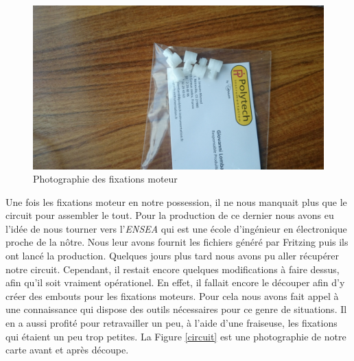 \documentclass[a4paper,10pt]{report}
\begin{document}
      \begin{figure}[htbp]%
	\centering
	\includegraphics[scale = 0.1]{img/fixations.jpg}
	\caption{Photographie des fixations moteur}
	\label{fixation}
      \end{figure}

      Une fois les fixations moteur en notre possession, il ne nous manquait 
plus que le circuit pour assembler le tout. Pour la production de ce dernier 
nous avons eu l'idée de nous tourner vers l'\textit{ENSEA} qui est une école 
d'ingénieur en électronique proche de la nôtre. Nous leur avons fournit les 
fichiers généré par Fritzing puis ils ont lancé la production. Quelques jours 
plus tard nous avons pu aller récupérer notre circuit. Cependant, il restait 
encore quelques modifications à faire dessus, afin qu'il soit vraiment 
opérationel. En effet, il fallait encore le découper afin d'y créer des embouts 
pour les fixations moteurs. Pour cela nous avons fait appel à une connaissance 
qui dispose des outils nécessaires pour ce genre de situations. Il en a aussi 
profité pour retravailler un peu, à l'aide d'une fraiseuse, les fixations qui 
étaient un peu trop petites. La Figure \ref{circuit} est une photographie de 
notre carte avant et après découpe.
\end{document}
